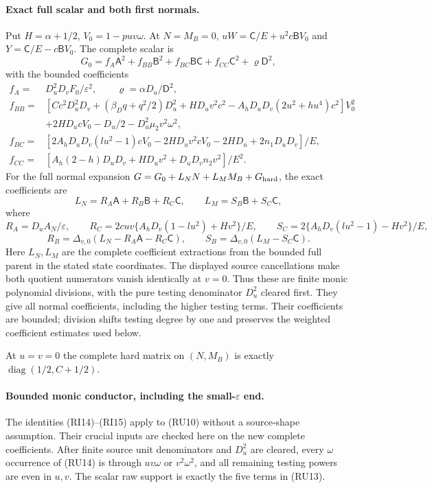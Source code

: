 \paragraph{Exact full scalar and both first normals.}
Put $H=\alpha+1/2$, $V_0=1-puv\omega$. At $N=M_B=0$,
$uW=\mathsf C/E+u^2c\mathsf BV_0$ and
$Y=\mathsf C/E-c\mathsf BV_0$. The complete scalar is
\[
 G_0=f_A\mathsf A^2+f_{BB}\mathsf B^2+
       f_{BC}\mathsf B\mathsf C+f_{CC}\mathsf C^2+
       \varrho\mathsf D^2,                                      \tag{RU13}
\]
with the bounded coefficients
\[
\begin{aligned}
 f_A={}&D_u^2D_vF_0/\varepsilon^2,\qquad
 \varrho=\alpha D_u/\mathsf D^2,\\
 f_{BB}={}&[Cc^2D_u^2D_v+(\beta_Dq+q^2/2)D_u^2+HD_uv^2c^2
             -A_hD_uD_v(2u^2+hu^4)c^2]V_0^2\\
          &+2HD_ucV_0-D_u/2-D_u^2\mu_2v^2\omega^2,\\
 f_{BC}={}&[2A_hD_uD_v(lu^2-1)cV_0-2HD_uv^2cV_0
                   -2HD_u+2n_1D_uD_v]/E,\\
 f_{CC}={}&[A_h(2-h)D_uD_v+HD_uv^2+D_uD_vn_2v^2]/E^2.
\end{aligned}                                                     \tag{RU14}
\]
For the full normal expansion
$G=G_0+L_NN+L_MM_B+G_{\rm hard}$, the exact coefficients are
\[
 L_N=R_A\mathsf A+R_B\mathsf B+R_C\mathsf C,
 \qquad L_M=S_B\mathsf B+S_C\mathsf C,                           \tag{RU15}
\]
where
\[
 R_A=D_uA_N/\varepsilon,\qquad R_C=2cuv\{A_hD_v(1-lu^2)+Hv^2\}/E,\qquad S_C=2\{A_hD_v(lu^2-1)-Hv^2\}/E,
\]
\[
 R_B=\Delta_{v,0}(L_N-R_A\mathsf A-R_C\mathsf C),\qquad
 S_B=\Delta_{v,0}(L_M-S_C\mathsf C).\tag{RU16}
\]
Here $L_N,L_M$ are the complete coefficient extractions from the bounded
full parent in the stated state coordinates. The displayed source
cancellations make both quotient numerators vanish identically at
$v=0$. Thus these are finite monic polynomial divisions, with the pure
testing denominator $D_u^2$ cleared first. They give all normal
coefficients, including the higher testing terms. Their coefficients
are bounded; division shifts testing degree by one and preserves the
weighted coefficient estimates used below.

At $u=v=0$ the complete hard matrix on $(N,M_B)$ is exactly
$\operatorname{diag}(1/2,C+1/2)$.

\paragraph{Bounded monic conductor, including the small-$\varepsilon$ end.}
The identities (RI14)--(RI15) apply to (RU10) without a source-shape
assumption. Their crucial inputs are checked here on the new complete
coefficients. After finite source unit denominators and $D_u^2$ are
cleared, every $\omega$ occurrence of (RU14) is through $uv\omega$
or $v^2\omega^2$, and all remaining testing powers are even in $u,v$.
The scalar raw support is exactly the five terms in (RU13).

